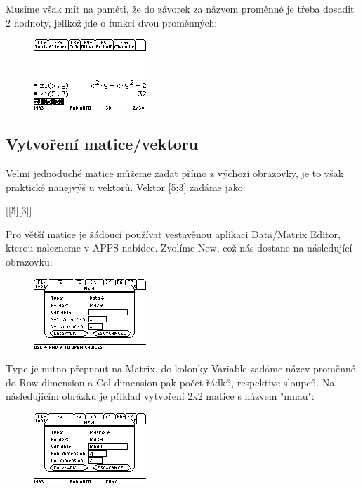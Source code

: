 \documentclass[10pt,a4paper,float]{article}
\begin{document}
Musíme však mít na paměti, že do závorek za názvem proměnné je třeba dosadit 2 hodnoty, jelikož jde o funkci dvou proměnných:

\begin{figure}[H]
	\centering
	\includegraphics[width=.5\textwidth]{img/2FUNC_UZITI}
\end{figure}

\pagebreak

\subsection{Vytvoření matice/vektoru}
Velmi jednoduché matice můžeme zadat přímo z výchozí obrazovky, je to však praktické nanejvýš u vektorů. Vektor [5;3] zadáme jako:

[[5][3]]

Pro větší matice je žádoucí používat vestavěnou aplikaci Data/Matrix Editor, kterou nalezneme v APPS nabídce. Zvolíme New, což nás dostane na následující obrazovku:

\begin{figure}[H]
	\centering
	\includegraphics[width=.5\textwidth]{img/DATAEDITOR}
\end{figure}

Type je nutno přepnout na Matrix, do kolonky Variable zadáme název proměnné, do Row dimension a Col dimension pak počet řádků, respektive sloupců.
Na následujícím obrázku je příklad vytvoření 2x2 matice s názvem "mnau":

\begin{figure}[H]
	\centering
	\includegraphics[width=.5\textwidth]{img/MNAUMATRIX}
\end{figure}
\end{document}
